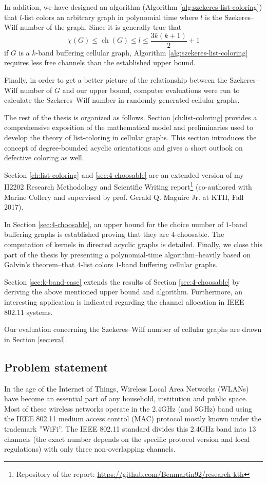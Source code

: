 \documentclass[a4paper, 12pt]{article}
\DeclareMathOperator*{\ch}{ch}
\begin{document}
In addition, we have designed an algorithm (Algorithm \ref{alg:szekeres-list-coloring}) that $l$-list colors an arbitrary graph in polynomial time where $l$ is the Szekeres\---Wilf number of the graph. Since it is generally true that 
$$\chi(G) \leqslant \ch(G) \leqslant l \leqslant \frac{3k(k+1)}{2}+1$$
if $G$ is a $k$-band buffering cellular graph, Algorithm \ref{alg:szekeres-list-coloring} requires less free channels than the established upper bound.

Finally, in order to get a better picture of the relationship between the Szekeres\---Wilf number of $G$ and our upper bound, computer evaluations were run to calculate the Szekeres\---Wilf number in randomly generated cellular graphs.

The rest of the thesis is organized as follows. Section \ref{ch:list-coloring} provides a comprehensive exposition of the mathematical model and preliminaries used to develop the theory of list-coloring in cellular graphs. This section introduces the concept of degree-bounded acyclic orientations and gives a short outlook on defective coloring as well.

Section \ref{ch:list-coloring} and \ref{sec:4-choosable} are an extended version of my II2202 Research Methodology and Scientific Writing report\footnote{Repository of the report: \url{https://github.com/Benmartin92/research-kth}} (co-authored with Marine Collery and supervised by prof. Gerald Q. Maguire Jr. at KTH, Fall 2017).

In Section \ref{sec:4-choosable}, an upper bound for the choice number of $1$-band buffering graphs is established proving that they are $4$-choosable. The computation of kernels in directed acyclic graphs is detailed. Finally, we close this part of the thesis by presenting a polynomial-time algorithm\---heavily based on Galvin's theorem\---that $4$-list colors $1$-band buffering cellular graphs.

Section \ref{sec:k-band-case} extends the results of Section \ref{sec:4-choosable} by deriving the above mentioned upper bound and algorithm. Furthermore, an interesting application is indicated regarding the channel allocation in IEEE 802.11 systems.

Our evaluation concerning the Szekeres\---Wilf number of cellular graphs are drawn in Section \ref{sec:eval}.

\subsection{Problem statement}
In the age of the Internet of Things, Wireless Local Area Networks (WLANs) have become an essential part of any household, institution and public space. Most of these wireless networks operate in the 2.4GHz (and 5GHz) band using the IEEE 802.11 medium access control (MAC) protocol mostly known under the trademark ''WiFi''. The IEEE 802.11 standard divides this 2.4GHz band into 13 channels (the exact number depends on the specific protocol version and local regulations) with only three non-overlapping channels.
\end{document}
